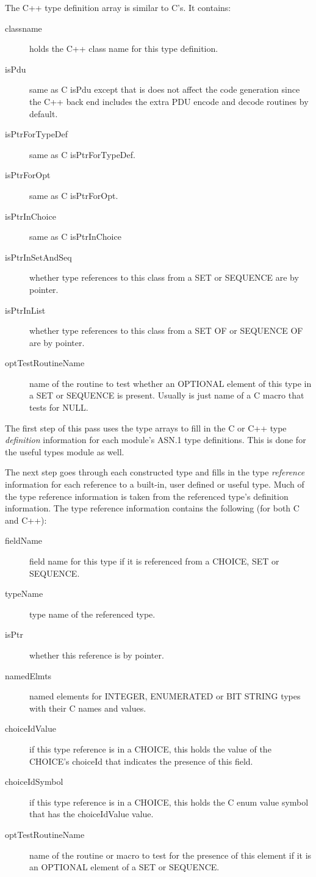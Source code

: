 The C++ type definition array is similar to C's. It contains:

\begin{description}
\item[classname] { holds the C++ {\C class} name for this type definition.}
\item[isPdu] { same as C isPdu except that is does not affect the code
generation since the C++ back end includes the extra PDU encode and
decode routines by default.}
\item[isPtrForTypeDef] { same as C isPtrForTypeDef. }
\item[isPtrForOpt] { same as C isPtrForOpt.}
\item[isPtrInChoice] { same as C isPtrInChoice}
\item[isPtrInSetAndSeq] { whether type references to this class
from a SET or SEQUENCE are by pointer.}
\item[isPtrInList] {whether type references to this class
from a SET OF or SEQUENCE OF are by pointer.}
\item[optTestRoutineName] { name of the routine to test whether an
OPTIONAL element of this type in a SET or SEQUENCE is present.
Usually is just name of a C macro that tests for NULL.}
\end{description}

The first step of this pass uses the type arrays to fill in the C or
C++ type {\em definition} information for each module's ASN.1 type
definitions.  This is done for the useful types module as well.

The next step goes through each constructed type and fills in the type
{\em reference} information for each reference to a built-in, user defined
or useful type.  Much of the type reference information is taken from
the referenced type's definition information.  The type reference
information contains the following (for both C and C++):

\begin{description}
\item[fieldName] { field name for this type if it is referenced from
a CHOICE, SET or SEQUENCE.}
\item[typeName] { type name of the referenced type.}
\item[isPtr] { whether this reference is by pointer.}
\item[namedElmts] { named elements for INTEGER, ENUMERATED or BIT
STRING types with their C names and values.}
\item[choiceIdValue] { if this type reference is in a CHOICE, this
holds the value of the CHOICE's choiceId that indicates the presence
of this field.}
\item[choiceIdSymbol] { if this type reference is in a CHOICE, this
holds the C enum value symbol that has the choiceIdValue value.}
\item[optTestRoutineName] { name of the routine or macro to test for
the presence of this element if it is an OPTIONAL element of a SET or SEQUENCE.}
\end{description}


